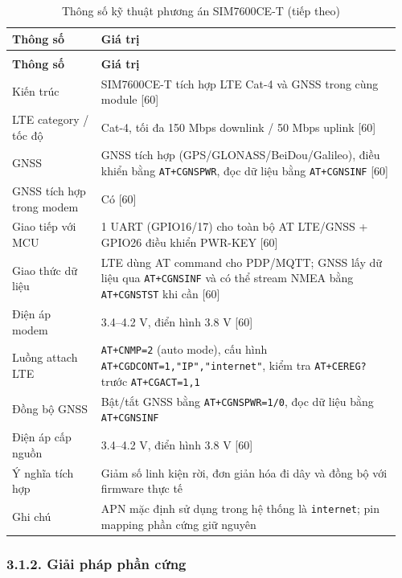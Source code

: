 \documentclass[a4paper]{extarticle}
\newcommand{\thesissettableid}[2]{%
  \renewcommand{\thetable}{#1}%
  \renewcommand{\theHtable}{#2}%
}
\begin{document}
{\thesissettableid{3.4}{tab-ch3-thong-so-ky-thuat-phuong-an-sim7600ce-t}
\def\LTcaptype{table}
\begin{longtable}{|L{0.220\linewidth}|L{0.740\linewidth}|}
\caption{Thông số kỹ thuật phương án SIM7600CE-T}\label{tab:ch3-thong-so-ky-thuat-phuong-an-sim7600ce-t}\\
\hline \textbf{Thông số} & \textbf{Giá trị} \\
\hline
\endfirsthead
\caption[]{Thông số kỹ thuật phương án SIM7600CE-T (tiếp theo)}\\
\hline \textbf{Thông số} & \textbf{Giá trị} \\
\hline
\endhead
\hline
\endfoot
\endlastfoot
Kiến trúc & SIM7600CE-T tích hợp LTE Cat-4 và GNSS trong cùng module
{[}60{]} \\\hline
LTE category / tốc độ & Cat-4, tối đa 150 Mbps downlink / 50 Mbps uplink
{[}60{]} \\\hline
GNSS & GNSS tích hợp (GPS/GLONASS/BeiDou/Galileo), điều khiển bằng
\texttt{AT+CGNSPWR}, đọc dữ liệu bằng \texttt{AT+CGNSINF} {[}60{]} \\\hline
GNSS tích hợp trong modem & Có {[}60{]} \\\hline
Giao tiếp với MCU & 1 UART (GPIO16/17) cho toàn bộ AT LTE/GNSS + GPIO26
điều khiển PWR-KEY {[}60{]} \\\hline
Giao thức dữ liệu & LTE dùng AT command cho PDP/MQTT; GNSS lấy dữ liệu
qua \texttt{AT+CGNSINF} và có thể stream NMEA bằng \texttt{AT+CGNSTST}
khi cần {[}60{]} \\\hline
Điện áp modem & 3.4--4.2 V, điển hình 3.8 V {[}60{]} \\\hline
Luồng attach LTE & \texttt{AT+CNMP=2} (auto mode), cấu hình
\texttt{AT+CGDCONT=1,"IP","internet"}, kiểm tra \texttt{AT+CEREG?} trước
\texttt{AT+CGACT=1,1} \\\hline
Đồng bộ GNSS & Bật/tắt GNSS bằng \texttt{AT+CGNSPWR=1/0}, đọc dữ liệu
bằng \texttt{AT+CGNSINF} \\\hline
Điện áp cấp nguồn & 3.4--4.2 V, điển hình 3.8 V {[}60{]} \\\hline
Ý nghĩa tích hợp & Giảm số linh kiện rời, đơn giản hóa đi dây và đồng bộ
với firmware thực tế \\\hline
Ghi chú & APN mặc định sử dụng trong hệ thống là \texttt{internet}; pin
mapping phần cứng giữ nguyên \\\hline
\end{longtable}
}


\subsubsection{3.1.2. Giải pháp phần
cứng}\label{321-giux1ea3i-phuxe1p-phux1ea7n-cux1ee9ng}
\end{document}
